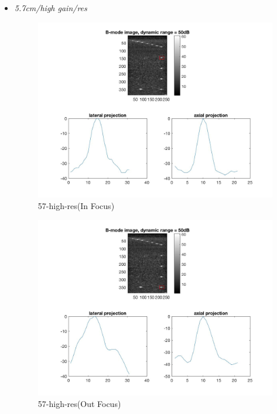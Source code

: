 \documentclass[12pts,a4paper]{article}
\begin{document}
\begin{itemize}
\item{\emph{5.7cm/high gain/res}}
\begin{center}
\end{center}
\begin{figure}[h]
    \centering
    \includegraphics[width=1.0\textwidth]{img_hw1/57-high-res1.jpg}
    \caption{57-high-res(In Focus)}
    \label{fig:mesh1}
\end{figure}
\pagebreak
\begin{figure}[h]
    \centering
    \includegraphics[width=1.0\textwidth]{img_hw1/57-high-res2.jpg}
    \caption{57-high-res(Out Focus)}
    \label{fig:mesh1}
\end{figure}
\pagebreak

\end{itemize}
\end{document}
